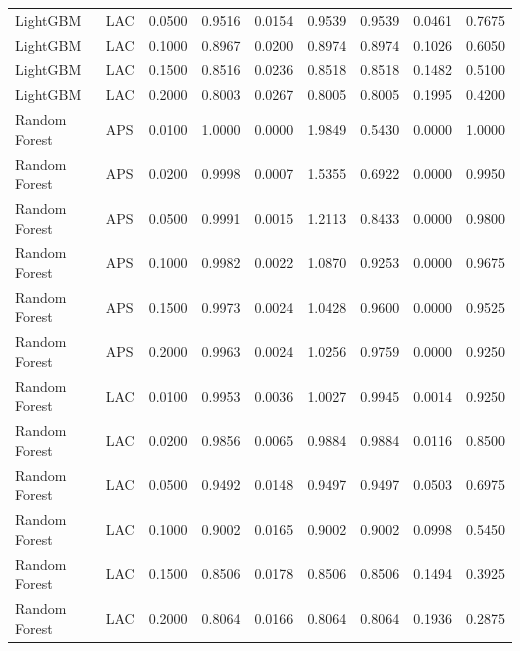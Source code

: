 \begin{tabular}{llrrrrrrr}
LightGBM & LAC & 0.0500 & 0.9516 & 0.0154 & 0.9539 & 0.9539 & 0.0461 & 0.7675 \\
LightGBM & LAC & 0.1000 & 0.8967 & 0.0200 & 0.8974 & 0.8974 & 0.1026 & 0.6050 \\
LightGBM & LAC & 0.1500 & 0.8516 & 0.0236 & 0.8518 & 0.8518 & 0.1482 & 0.5100 \\
LightGBM & LAC & 0.2000 & 0.8003 & 0.0267 & 0.8005 & 0.8005 & 0.1995 & 0.4200 \\
Random Forest & APS & 0.0100 & 1.0000 & 0.0000 & 1.9849 & 0.5430 & 0.0000 & 1.0000 \\
Random Forest & APS & 0.0200 & 0.9998 & 0.0007 & 1.5355 & 0.6922 & 0.0000 & 0.9950 \\
Random Forest & APS & 0.0500 & 0.9991 & 0.0015 & 1.2113 & 0.8433 & 0.0000 & 0.9800 \\
Random Forest & APS & 0.1000 & 0.9982 & 0.0022 & 1.0870 & 0.9253 & 0.0000 & 0.9675 \\
Random Forest & APS & 0.1500 & 0.9973 & 0.0024 & 1.0428 & 0.9600 & 0.0000 & 0.9525 \\
Random Forest & APS & 0.2000 & 0.9963 & 0.0024 & 1.0256 & 0.9759 & 0.0000 & 0.9250 \\
Random Forest & LAC & 0.0100 & 0.9953 & 0.0036 & 1.0027 & 0.9945 & 0.0014 & 0.9250 \\
Random Forest & LAC & 0.0200 & 0.9856 & 0.0065 & 0.9884 & 0.9884 & 0.0116 & 0.8500 \\
Random Forest & LAC & 0.0500 & 0.9492 & 0.0148 & 0.9497 & 0.9497 & 0.0503 & 0.6975 \\
Random Forest & LAC & 0.1000 & 0.9002 & 0.0165 & 0.9002 & 0.9002 & 0.0998 & 0.5450 \\
Random Forest & LAC & 0.1500 & 0.8506 & 0.0178 & 0.8506 & 0.8506 & 0.1494 & 0.3925 \\
Random Forest & LAC & 0.2000 & 0.8064 & 0.0166 & 0.8064 & 0.8064 & 0.1936 & 0.2875 \\
\bottomrule
\end{tabular}
